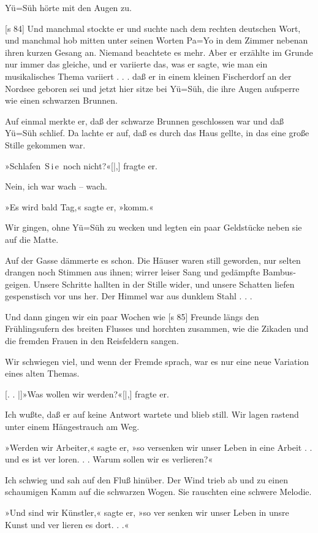 Yü=Süh hörte mit den Augen zu.

[s 84]
Und manchmal stockte er und suchte nach dem
rechten deutschen Wort, und manchmal hob mitten
unter seinen Worten Pa=Yo in dem Zimmer nebenan
ihren kurzen Gesang an. Niemand beachtete es mehr.
Aber er erzählte im Grunde nur immer das gleiche,
und er variierte das, was er sagte, wie man ein
musikalisches Thema variiert . . . daß er in einem
kleinen Fischerdorf an der Nordsee geboren sei und
jetzt hier sitze bei Yü=Süh, die ihre Augen aufsperre
wie einen schwarzen Brunnen.

Auf einmal merkte er, daß der schwarze Brunnen
geschlossen war und daß Yü=Süh schlief. Da lachte
er auf, daß es durch das Haus gellte, in das eine
große Stille gekommen war.

»Schlafen  S i e  noch nicht?«[|,] fragte er.

Nein, ich war wach – wach.

»Es wird bald Tag,« sagte er, »komm.«

Wir gingen, ohne Yü=Süh zu wecken und legten
ein paar Geldstücke neben sie auf die Matte.

Auf der Gasse dämmerte es schon. Die Häuser
waren still geworden, nur selten drangen noch Stimmen
aus ihnen; wirrer leiser Sang und gedämpfte Bambus­
geigen. Unsere Schritte hallten in der Stille wider,
und unsere Schatten liefen gespenstisch vor uns her.
Der Himmel war aus dunklem Stahl . . .

Und dann gingen wir ein paar Wochen wie
[s 85]
Freunde längs den Frühlingsufern des breiten Flusses
und horchten zusammen, wie die Zikaden und die
fremden Frauen in den Reisfeldern sangen.

Wir schwiegen viel, und wenn der Fremde sprach,
war es nur eine neue Variation eines alten Themas.

[. . |]»Was wollen wir werden?«[|,] fragte er.

Ich wußte, daß er auf keine Antwort wartete
und blieb still. Wir lagen rastend unter einem
Hängestrauch am Weg.

»Werden wir Arbeiter,« sagte er, »so versenken
wir unser Leben in eine Arbeit . . und es ist ver­
loren. . . Warum sollen wir es verlieren?«

Ich schwieg und sah auf den Fluß hinüber. Der
Wind trieb ab und zu einen schaumigen Kamm auf
die schwarzen Wogen. Sie rauschten eine schwere
Melodie.

»Und sind wir Künstler,« sagte er, »so ver­
senken wir unser Leben in unsre Kunst und ver­
lieren es dort. . .«

